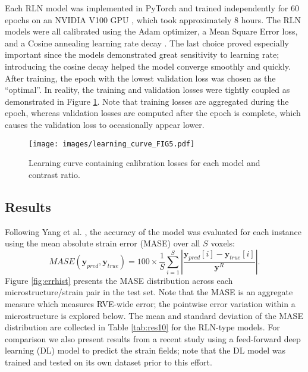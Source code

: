\documentclass[3p, preprint]{elsarticle}
\newcommand{\bmy}{\bm{y}}
\newenvironment{revision} {} {}
\begin{document}
Each RLN model was implemented in PyTorch \cite{Paszke_2019pytorch} and trained independently for 60 epochs on an NVIDIA V100 GPU \cite{PACE}, which took approximately 8 hours. The RLN models were all calibrated using the Adam optimizer, a Mean Square Error loss, and a Cosine annealing learning rate decay \cite{loshchilov2017sgdr}. The last choice proved especially important since the models demonstrated great sensitivity to learning rate; introducing the cosine decay helped the model converge smoothly and quickly. After training, the epoch with the lowest validation loss was chosen as the ``optimal''. 
In reality, the training and validation losses were tightly coupled \begin{revision} as demonstrated in Figure \ref{fig:learning_curve}. Note that training losses are aggregated during the epoch, whereas validation losses are computed after the epoch is complete, which causes the validation loss to occasionally appear lower.\end{revision} 

\begin{figure}
    \centering
    \texttt{[image: images/learning\_curve\_FIG5.pdf]}
    \caption{\begin{revision}Learning curve containing calibration losses for each model and contrast ratio.\end{revision}}
    \label{fig:learning_curve}
\end{figure}

\subsection{Results}

Following Yang et al. \cite{yang2019}, the accuracy of the model was evaluated for each instance using the mean absolute strain error (MASE) \begin{revision} over all $S$ voxels\end{revision}:
\begin{equation}
    MASE(\bmy_{pred}, \bmy_{true}) = 100 \times \frac{1}{S} \sum\limits_{i=1}^S\left| \frac{\bmy_{pred}[i] - \bmy_{true}[i]} {\bmy^R} \right|
    \label{eq:ASE}.
\end{equation}
\noindent Figure \ref{fig:errhist} presents the MASE distribution across each microstructure/strain pair in the test set. Note that the MASE is an aggregate measure which measures RVE-wide error; the pointwise error variation within a microstructure is explored below. The mean and standard deviation of the MASE distribution are collected in Table \ref{tab:res10} for the RLN-type models. For comparison we also present results from a recent study \cite{yang2019} using a feed-forward deep learning (DL) model to predict the strain fields; note that the DL model was trained and tested on its own dataset prior to this effort. 
\end{document}
